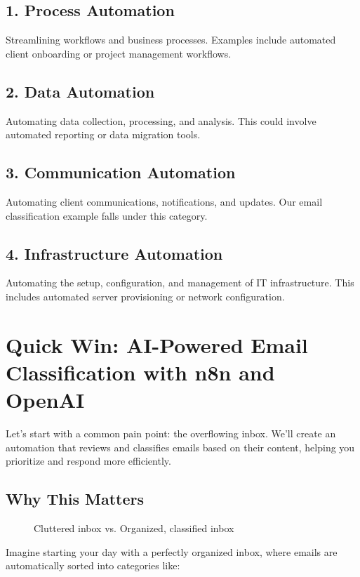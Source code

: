 \subsection{1. Process Automation}
Streamlining workflows and business processes. Examples include automated client onboarding or project management workflows.

\subsection{2. Data Automation}
Automating data collection, processing, and analysis. This could involve automated reporting or data migration tools.

\subsection{3. Communication Automation}
Automating client communications, notifications, and updates. Our email classification example falls under this category.

\subsection{4. Infrastructure Automation}
Automating the setup, configuration, and management of IT infrastructure. This includes automated server provisioning or network configuration.

\section{Quick Win: AI-Powered Email Classification with n8n and OpenAI}

Let's start with a common pain point: the overflowing inbox. We'll create an automation that reviews and classifies emails based on their content, helping you prioritize and respond more efficiently.

\subsection{Why This Matters}

\begin{figure}[h]
    \centering
    \caption{Cluttered inbox vs. Organized, classified inbox}
\end{figure}

Imagine starting your day with a perfectly organized inbox, where emails are automatically sorted into categories like:

